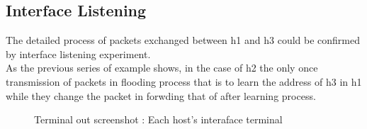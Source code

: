 \subsection{Interface Listening}
The detailed process of packets exchanged between h1 and h3 could be confirmed by interface listening experiment.\\
As the previous series of example shows, in the case of h2 the only once transmission of packets in flooding process that is to learn the address of h3 in h1 while they change the packet in forwding that of after learning process.
\clearpage
\vspace{-4mm}
\begin{figure}[h!]
\centering
{}
\caption{Terminal out screenshot : Each host's interaface terminal}
\end{figure}
\vspace{-8mm}
